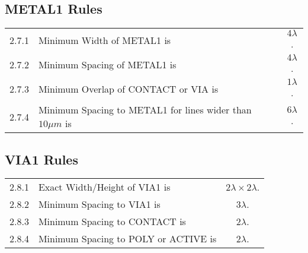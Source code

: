 \documentclass[10pt,a4paper,oneside]{article}
\newcounter{ct}
\begin{document}
\subsection{METAL1 Rules}\label{design_rules_metal1_rules}

\begin{center}
\end{center}

\begin{flushleft}
    \begin{tabular}{c l c}
        2.7.1   & Minimum Width of METAL1 is & $4 \lambda$. \\
        2.7.2   & Minimum Spacing of METAL1 is & $4 \lambda$. \\
        2.7.3   & Minimum Overlap of CONTACT or VIA is & $1 \lambda$. \\
        2.7.4   & Minimum Spacing to METAL1 for lines wider than $10 \mu m$ is & $6 \lambda$. \\
    \end{tabular}
\end{flushleft}

\subsection{VIA1 Rules}\label{design_rules_via1_rules}

\begin{flushleft}
    \begin{tabular}{c l c}
        2.8.1   & Exact Width/Height of VIA1 is & $ 2 \lambda \times 2 \lambda$. \\
        2.8.2   & Minimum Spacing to VIA1 is & $3 \lambda$. \\
        2.8.3   & Minimum Spacing to CONTACT is & $2 \lambda$. \\
        2.8.4   & Minimum Spacing to POLY or ACTIVE is & $2 \lambda$. \\
    \end{tabular}
\end{flushleft}
\end{document}
